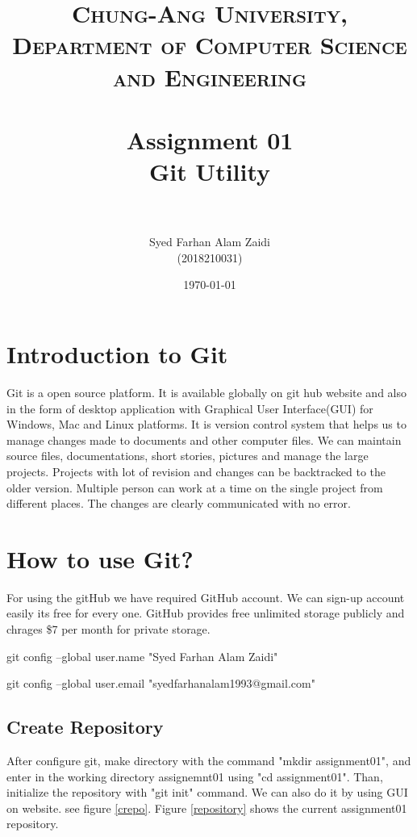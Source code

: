 \documentclass[paper=a4, fontsize=12pt]{scrartcl}
\title{	
\normalfont \normalsize 
\textsc{Chung-Ang University, Department of Computer Science and Engineering} \\ [25pt] %
\horrule{0.5pt} \\[0.4cm] %
\huge Assignment 01 \\
Git Utility\\  %
\horrule{1pt} \\[0.5cm] %
}
\author{Syed Farhan Alam Zaidi \\ (2018210031)} %
\date{\normalsize\today} %
\numberwithin{equation}{section} %
\numberwithin{figure}{section} %
\numberwithin{table}{section} %
\begin{document}
\maketitle %


\section{Introduction to Git}
\par Git is a open source platform. It is available globally on git hub website and also in the form of desktop application with Graphical User Interface(GUI) for Windows, Mac and Linux platforms.  It is version control system that helps us to manage changes made to documents and other computer files. We can maintain source files, documentations, short stories, pictures and manage the large projects. Projects with lot of revision and changes can be backtracked to the older version. Multiple person can work at a time on the single project from different places.  The changes are clearly communicated with no error.

\section{How to use Git?}
\par For using the gitHub we have required GitHub account. We can sign-up account easily its free for every one. GitHub provides free unlimited storage publicly and chrages \$7 per month for private storage.  

   \par git config --global user.name "Syed Farhan Alam Zaidi"
   \par  git config --global user.email "syedfarhanalam1993@gmail.com"

\subsection{Create Repository}
\par After configure git, make directory with the command "mkdir assignment01", and enter in the working directory assignemnt01 using "cd assignment01". Than, initialize the repository with "git init" command. We can also do it by using GUI on website. see figure \ref{crepo}.
Figure \ref{repository} shows the current assignment01 repository.
\end{document}
